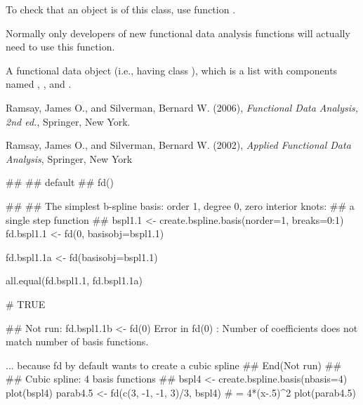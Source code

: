 \documentclass{article}
\begin{document}
\begin{Details}\relax
To check that an object is of this class, use function
.

Normally only developers of new functional data analysis
functions will actually need to use this function.
\end{Details}
\begin{Value}
A functional data object (i.e., having class ), which is a
list with components named , , and
.
\end{Value}
\begin{Source}\relax
Ramsay, James O., and Silverman, Bernard W. (2006), \emph{Functional
Data Analysis, 2nd ed.}, Springer, New York.

Ramsay, James O., and Silverman, Bernard W. (2002), \emph{Applied
Functional Data Analysis}, Springer, New York
\end{Source}
\begin{SeeAlso}\relax
{}
\end{SeeAlso}
\begin{Examples}
\begin{ExampleCode}
##
## default
##
fd()

##
## The simplest b-spline basis:  order 1, degree 0, zero interior knots:
##       a single step function
##
bspl1.1 <- create.bspline.basis(norder=1, breaks=0:1)
fd.bspl1.1 <- fd(0, basisobj=bspl1.1)

fd.bspl1.1a <- fd(basisobj=bspl1.1)

all.equal(fd.bspl1.1, fd.bspl1.1a)

# TRUE

## Not run: 
fd.bspl1.1b <- fd(0)
Error in fd(0) :
  Number of coefficients does not match number of basis functions.

... because fd by default wants to create a cubic spline
## End(Not run)
##
## Cubic spline:  4  basis functions
##
bspl4 <- create.bspline.basis(nbasis=4)
plot(bspl4)
parab4.5 <- fd(c(3, -1, -1, 3)/3, bspl4)
# = 4*(x-.5)^2
plot(parab4.5)

\end{ExampleCode}
\end{Examples}
\end{document}

